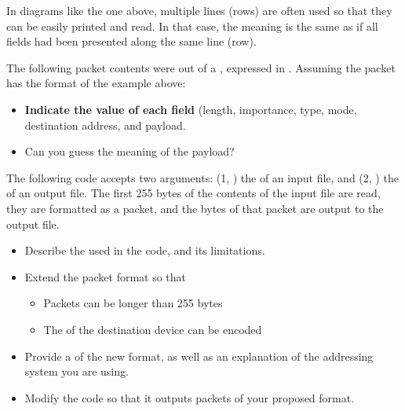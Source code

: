 \begin{remark}
In diagrams like the one above, multiple lines (rows) are often used so that they can be
easily printed and read. In that case, the meaning is the same as if all fields had been
presented along the same line (row).
\end{remark}

\begin{exercise}
The following packet contents were  out of a ,
expressed in . Assuming the packet has the format of the example above:
% 
\begin{itemize}
\item \textbf{Indicate the value of each field} (length, importance, type, mode, destination address, and payload.
\item Can you guess the meaning of the payload?
\end{itemize}
% 
\begin{center}
\end{center}
\end{exercise}

\begin{exercise}
The following code accepts two arguments: (1, ) the  of an input file, 
and (2, ) the  of an output file.
The first 255 bytes of the contents of the input file are read, 
they are formatted as a packet, and the bytes of that packet
are output to the output file.
% 
\begin{itemize}
\item Describe the  used in the code, and its limitations.

\item Extend the packet format so that 
 \begin{itemize}
   \item Packets can be longer than 255 bytes
   \item The  of the destination device can be encoded
  \end{itemize}
  
\item Provide a  of the new format, 
as well as an explanation of the addressing system you are using.

\item Modify the code so that it outputs packets of your proposed format.
\end{itemize}
\end{exercise}

